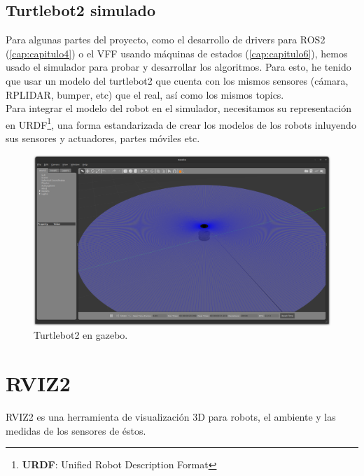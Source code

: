 \subsection{Turtlebot2 simulado}
\label{subsec:turtlebot2_sim}

Para algunas partes del proyecto, como el desarrollo de drivers para ROS2 (\ref{cap:capitulo4}) o el VFF usando máquinas de estados (\ref{cap:capitulo6}), hemos usado el simulador para probar y desarrollar los algoritmos. Para esto, he tenido que usar un modelo del turtlebot2 que cuenta con los mismos sensores (cámara, RPLIDAR, bumper, etc) que el real, así como los mismos topics.\\

Para integrar el modelo del robot en el simulador, necesitamos su representación en URDF\footnote{\textbf{URDF}: Unified Robot Description Format}, una forma estandarizada de crear los modelos de los robots inluyendo sus sensores y actuadores, partes móviles etc.

\begin{figure} [H]
    \begin{center}
        \includegraphics[width=14cm]{figs/c3/turtlebot2_sim.png}
    \end{center}
    \caption[Turtlebot2 simulado]{Turtlebot2 en gazebo.}
    \label{fig:turtlebot_2_sim}
\end{figure}


\newpage

\section{RVIZ2}
\label{sec:rviz2}

RVIZ2 es una herramienta de visualización 3D para robots, el ambiente y las medidas de los sensores de éstos.

